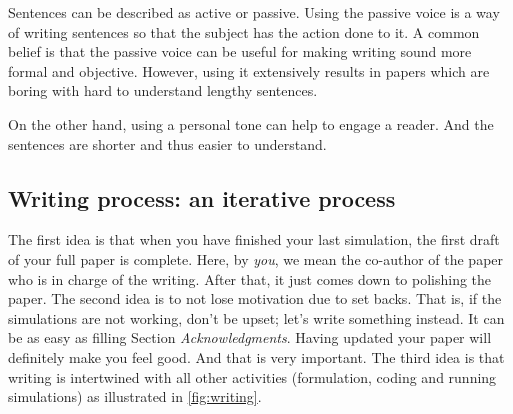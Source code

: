 \documentclass[authoryear,3p,times,preprint,review,fleqn]{elsarticle}
\numberwithin{equation}{section}
\theoremstyle{remark}
\begin{document}
Sentences can be described as active or passive. Using the passive voice is a way of writing sentences so that the subject has the action done to it. A common belief is that the passive voice can be useful for making writing sound more formal and objective. However, using it extensively results in papers which are boring with hard to understand lengthy sentences.

On the other hand, using a personal tone can help to engage a reader. And the sentences are shorter and thus easier to understand. 


\subsection{Writing process: an iterative process}\label{sec:writing-process}

The first idea is that when you have finished your last simulation, the first draft of your full paper is complete. Here, by \textit{you}, we mean the co-author of the paper who is in charge of the writing. After that, it just comes down to polishing the paper. The second idea is to not lose motivation due to set backs. That is, if the simulations are not working, don't be upset; let's write something instead. It can be as easy as filling Section \textit{Acknowledgments}. Having updated your paper will definitely make you feel good. And that is very important. The third idea is that writing is intertwined with all other activities (formulation, coding and running simulations) as illustrated in \cref{fig:writing}.
\end{document}

